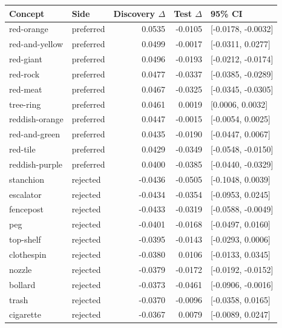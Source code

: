 \begin{tabular}{llrrl}
\toprule
Concept & Side & Discovery $\Delta$ & Test $\Delta$ & 95\% CI \\
\midrule
red-orange & preferred & 0.0535 & -0.0105 & [-0.0178, -0.0032] \\
red-and-yellow & preferred & 0.0499 & -0.0017 & [-0.0311, 0.0277] \\
red-giant & preferred & 0.0496 & -0.0193 & [-0.0212, -0.0174] \\
red-rock & preferred & 0.0477 & -0.0337 & [-0.0385, -0.0289] \\
red-meat & preferred & 0.0467 & -0.0325 & [-0.0345, -0.0305] \\
tree-ring & preferred & 0.0461 & 0.0019 & [0.0006, 0.0032] \\
reddish-orange & preferred & 0.0447 & -0.0015 & [-0.0054, 0.0025] \\
red-and-green & preferred & 0.0435 & -0.0190 & [-0.0447, 0.0067] \\
red-tile & preferred & 0.0429 & -0.0349 & [-0.0548, -0.0150] \\
reddish-purple & preferred & 0.0400 & -0.0385 & [-0.0440, -0.0329] \\
stanchion & rejected & -0.0436 & -0.0505 & [-0.1048, 0.0039] \\
escalator & rejected & -0.0434 & -0.0354 & [-0.0953, 0.0245] \\
fencepost & rejected & -0.0433 & -0.0319 & [-0.0588, -0.0049] \\
peg & rejected & -0.0401 & -0.0168 & [-0.0497, 0.0160] \\
top-shelf & rejected & -0.0395 & -0.0143 & [-0.0293, 0.0006] \\
clothespin & rejected & -0.0380 & 0.0106 & [-0.0133, 0.0345] \\
nozzle & rejected & -0.0379 & -0.0172 & [-0.0192, -0.0152] \\
bollard & rejected & -0.0373 & -0.0461 & [-0.0906, -0.0016] \\
trash & rejected & -0.0370 & -0.0096 & [-0.0358, 0.0165] \\
cigarette & rejected & -0.0367 & 0.0079 & [-0.0089, 0.0247] \\
\bottomrule
\end{tabular}
